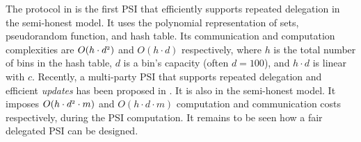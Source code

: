 The protocol in \cite{eopsi} is the first PSI that efficiently supports repeated delegation in the semi-honest model. It uses the polynomial representation of sets, pseudorandom function, and hash table. Its communication and computation complexities are $O(h\cdot d^{\scriptscriptstyle 2})$ and $O(h\cdot d)$ respectively, where $h$ is the total number of bins in the hash table, $d$ is a bin's capacity (often $d=100$), and $h\cdot d$ is linear with $c$.  
%
Recently, a multi-party PSI that supports repeated delegation and efficient \emph{updates} has been proposed in \cite{AbadiDMT22}. It is also in the semi-honest model. It imposes $O(h\cdot d^{\scriptscriptstyle 2}\cdot m)$ and $O(h\cdot d\cdot m)$  computation and communication costs respectively, during the PSI computation. It remains to be seen how a fair delegated PSI can be designed.










 
 
 